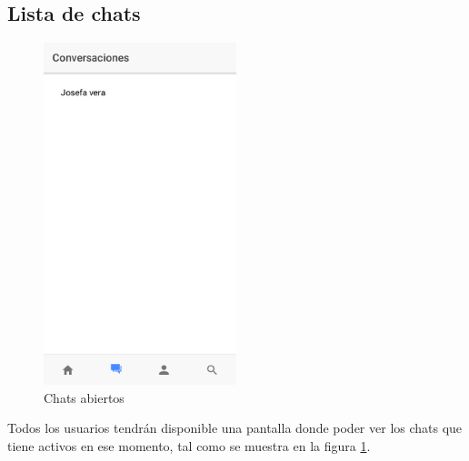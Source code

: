 \subsection{Lista de chats}
\begin{figure}[!h]
    \centering
    \includegraphics[width=0.5\textwidth]{images/screenshots/Doctor-vista-chats-abiertos.png}
    \caption{Chats abiertos}
    \label{vista-chats-abiertos}
\end{figure}

Todos los usuarios tendrán disponible una pantalla donde poder ver los chats
que tiene activos en ese momento, tal como se muestra en la figura
\ref{vista-chats-abiertos}.
\clearpage

